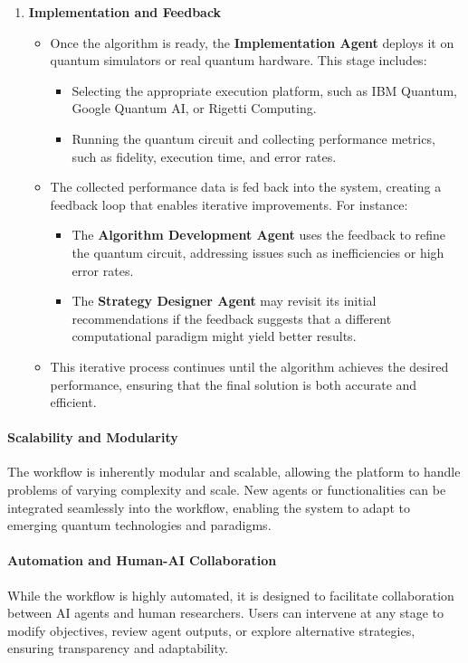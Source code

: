 \documentclass[12pt]{article}
\begin{document}
\begin{enumerate}
    \item \textbf{Implementation and Feedback}
    \begin{itemize}
        \item Once the algorithm is ready, the \textbf{Implementation Agent} deploys it on quantum simulators or real quantum hardware. This stage includes:
        \begin{itemize}
            \item Selecting the appropriate execution platform, such as IBM Quantum, Google Quantum AI, or Rigetti Computing.
            \item Running the quantum circuit and collecting performance metrics, such as fidelity, execution time, and error rates.
        \end{itemize}
        \item The collected performance data is fed back into the system, creating a feedback loop that enables iterative improvements. For instance:
        \begin{itemize}
            \item The \textbf{Algorithm Development Agent} uses the feedback to refine the quantum circuit, addressing issues such as inefficiencies or high error rates.
            \item The \textbf{Strategy Designer Agent} may revisit its initial recommendations if the feedback suggests that a different computational paradigm might yield better results.
        \end{itemize}
        \item This iterative process continues until the algorithm achieves the desired performance, ensuring that the final solution is both accurate and efficient.
    \end{itemize}
\end{enumerate}

\paragraph{Scalability and Modularity}
The workflow is inherently modular and scalable, allowing the platform to handle problems of varying complexity and scale. New agents or functionalities can be integrated seamlessly into the workflow, enabling the system to adapt to emerging quantum technologies and paradigms.

\paragraph{Automation and Human-AI Collaboration}
While the workflow is highly automated, it is designed to facilitate collaboration between AI agents and human researchers. Users can intervene at any stage to modify objectives, review agent outputs, or explore alternative strategies, ensuring transparency and adaptability.
\end{document}
